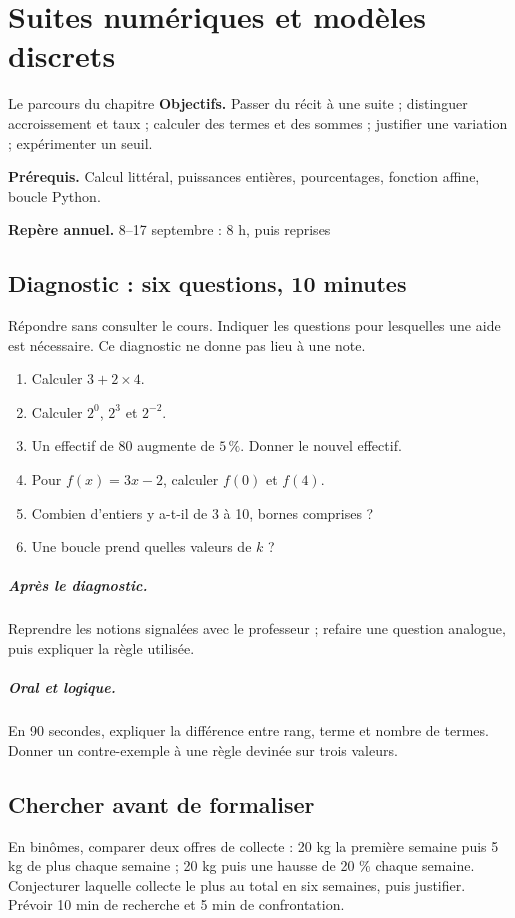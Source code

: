 \chapter{Suites numériques et modèles discrets}\label{C01}
\begin{repere}{Le parcours du chapitre}
\textbf{Objectifs.} Passer du récit à une suite ; distinguer accroissement et taux ; calculer des termes et des sommes ; justifier une variation ; expérimenter un seuil.

\textbf{Prérequis.} Calcul littéral, puissances entières, pourcentages, fonction affine, boucle Python.

\textbf{Repère annuel.} 8–17 septembre : 8 h, puis reprises\end{repere}
\section*{Diagnostic : six questions, 10 minutes}\label{C01-D}
Répondre sans consulter le cours. Indiquer les questions pour lesquelles une aide est nécessaire. Ce diagnostic ne donne pas lieu à une note.
\begin{enumerate}
\item Calculer $3+2\times4$.
\item Calculer $2^0$, $2^3$ et $2^{-2}$.
\item Un effectif de 80 augmente de $5\,\%$. Donner le nouvel effectif.
\item Pour $f(x)=3x-2$, calculer $f(0)$ et $f(4)$.
\item Combien d’entiers y a-t-il de 3 à 10, bornes comprises ?
\item Une boucle  prend quelles valeurs de $k$ ?
\end{enumerate}
\paragraph{Après le diagnostic.} Reprendre les notions signalées avec le professeur ; refaire une question analogue, puis expliquer la règle utilisée.
\paragraph{Oral et logique.} En 90 secondes, expliquer la différence entre rang, terme et nombre de termes. Donner un contre-exemple à une règle devinée sur trois valeurs.
\clearpage
\section*{Chercher avant de formaliser}\label{C01-RECH}
En binômes, comparer deux offres de collecte : 20 kg la première semaine puis 5 kg de plus chaque semaine ; 20 kg puis une hausse de 20 \% chaque semaine. Conjecturer laquelle collecte le plus au total en six semaines, puis justifier. Prévoir 10 min de recherche et 5 min de confrontation.
